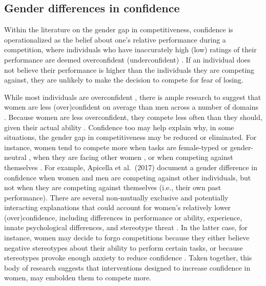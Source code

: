 \documentclass[a4paper,nobind]{templates/ociamthesis}
\begin{document}
\hypertarget{gender-differences-in-confidence}{%
\subsection{Gender differences in confidence}\label{gender-differences-in-confidence}}

Within the literature on the gender gap in competitiveness, confidence is operationalized as the belief about one's relative performance during a competition, where individuals who have inaccurately high (low) ratings of their performance are deemed overconfident (underconfident) \autocites{Niederle2011}[also see overplacement in][]{Moore2008}. If an individual does not believe their performance is higher than the individuals they are competing against, they are unlikely to make the decision to compete for fear of losing.

While most individuals are overconfident \autocite{Alicke2013,Dunning2004b}, there is ample research to suggest that women are less (over)confident on average than men across a number of domains \autocite{Mobius2011,Niederle2011,Croson2009,Lundeberg1994,Niederle2007,Bertrand2010a,Beyer1990,Beyer1997,Jakobsson2013}. Because women are less overconfident, they compete less often than they should, given their actual ability \autocite{Niederle2007}. Confidence too may help explain why, in some situations, the gender gap in competitiveness may be reduced or eliminated. For instance, women tend to compete more when tasks are female-typed or gender-neutral \autocite{Iriberri2017,Boschini2014,Boschini2019,Apicella2015,Grosse2010,Gunther2010,Dreber2014,Dreber2011,Shurchkov2012}, when they are facing other women \autocite{DattaGupta2013,Booth2012}, or when competing against themselves \autocite{Apicella2017a,Bonte2018,Carpenter2018,Apicella2020}. For example, Apicella et al.~(2017) document a gender difference in confidence when women and men are competing against other individuals, but not when they are competing against themselves (i.e., their own past performance). There are several non-mutually exclusive and potentially interacting explanations that could account for women's relatively lower (over)confidence, including differences in performance or ability, experience, innate psychological differences, and stereotype threat \autocite{Steele1997,Spencer1999,Spencer2016}. In the latter case, for instance, women may decide to forgo competitions because they either believe negative stereotypes about their ability to perform certain tasks, or because stereotypes provoke enough anxiety to reduce confidence \autocite{Gunther2010,Grosse2010,Iriberri2017,Shurchkov2012,Burow2017}. Taken together, this body of research suggests that interventions designed to increase confidence in women, may embolden them to compete more.
\end{document}
